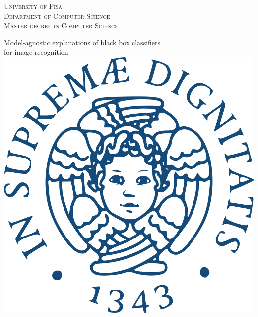 \documentclass[
    pdftex,
    fontsize=11pt,
    a4paper
   ]{scrbook}
\begin{document}
\begin{titlepage}

\center %
 

\textsc{\LARGE University of Pisa}\\[1.5cm] %
\textsc{\Large Department of Computer Science}\\[0.5cm] %
\textsc{\large Master degree in Computer Science}\\[0.9cm] %
\vspace{8mm}



\huge Model-agnostic explanations of black box classifiers\\
for image recognition
\\[2.0cm]

\includegraphics[scale=0.1]{cheru-trasp.png}\\[1cm] 
 

\end{titlepage}
\end{document}
